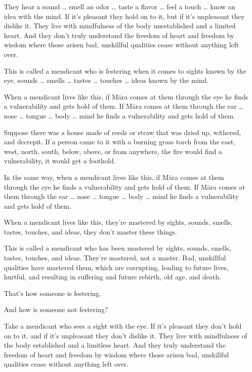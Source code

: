 \documentclass[12pt,openany]{book}%
\begin{document}
They hear a sound … smell an odor … taste a flavor … feel a touch … know an idea with the mind. If it’s pleasant they hold on to it, but if it’s unpleasant they dislike it. They live with mindfulness of the body unestablished and a limited heart. And they don’t truly understand the freedom of heart and freedom by wisdom where those arisen bad, unskillful qualities cease without anything left over. 

This is called a mendicant who is festering when it comes to sights known by the eye, sounds … smells … tastes … touches … ideas known by the mind. 

When a mendicant lives like this, if \textsanskrit{Māra} comes at them through the eye he finds a vulnerability and gets hold of them. If \textsanskrit{Māra} comes at them through the ear … nose … tongue … body … mind he finds a vulnerability and gets hold of them. 

Suppose there was a house made of reeds or straw that was dried up, withered, and decrepit. If a person came to it with a burning grass torch from the east, west, north, south, below, above, or from anywhere, the fire would find a vulnerability, it would get a foothold. 

In the same way, when a mendicant lives like this, if \textsanskrit{Māra} comes at them through the eye he finds a vulnerability and gets hold of them. If \textsanskrit{Māra} comes at them through the ear … nose … tongue … body … mind he finds a vulnerability and gets hold of them. 

When a mendicant lives like this, they’re mastered by sights, sounds, smells, tastes, touches, and ideas, they don’t master these things. 

This is called a mendicant who has been mastered by sights, sounds, smells, tastes, touches, and ideas. They’re mastered, not a master. Bad, unskillful qualities have mastered them, which are corrupting, leading to future lives, hurtful, and resulting in suffering and future rebirth, old age, and death. 

That’s how someone is festering. 

And how is someone not festering? 

Take a mendicant who sees a sight with the eye. If it’s pleasant they don’t hold on to it, and if it’s unpleasant they don’t dislike it. They live with mindfulness of the body established and a limitless heart. And they truly understand the freedom of heart and freedom by wisdom where those arisen bad, unskillful qualities cease without anything left over. 
\end{document}
